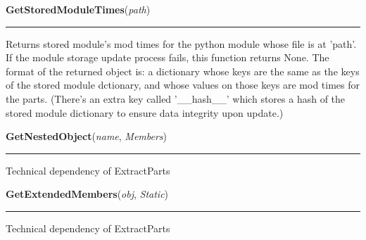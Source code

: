 \hspace{.8\funcindent}\begin{boxedminipage}{\funcwidth}

    \raggedright \textbf{GetStoredModuleTimes}(\textit{path})

    \vspace{-1.5ex}

    \rule{\textwidth}{0.5\fboxrule}
\setlength{\parskip}{2ex}
    Returns stored module's mod times for the python module whose file is 
    at 'path'. If the module storage update process fails, this function 
    returns None. The format of the returned object is: a dictionary whose 
    keys are the same as the keys of the stored module dctionary, and whose
    values on those keys are mod times for the parts.   (There's an extra 
    key called '\_\_hash\_\_' which stores a hash of the stored module 
    dictionary to ensure data integrity upon update.)

\setlength{\parskip}{1ex}
    \end{boxedminipage}

    \label{System:Storage:GetNestedObject}

    \vspace{0.5ex}

\hspace{.8\funcindent}\begin{boxedminipage}{\funcwidth}

    \raggedright \textbf{GetNestedObject}(\textit{name}, \textit{Members})

    \vspace{-1.5ex}

    \rule{\textwidth}{0.5\fboxrule}
\setlength{\parskip}{2ex}
    Technical dependency of ExtractParts

\setlength{\parskip}{1ex}
    \end{boxedminipage}

    \label{System:Storage:GetExtendedMembers}

    \vspace{0.5ex}

\hspace{.8\funcindent}\begin{boxedminipage}{\funcwidth}

    \raggedright \textbf{GetExtendedMembers}(\textit{obj}, \textit{Static})

    \vspace{-1.5ex}

    \rule{\textwidth}{0.5\fboxrule}
\setlength{\parskip}{2ex}
    Technical dependency of ExtractParts

\setlength{\parskip}{1ex}
    \end{boxedminipage}

